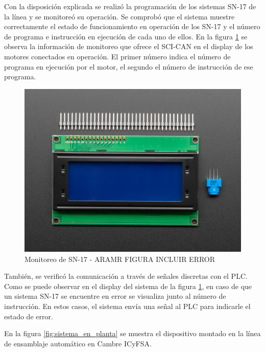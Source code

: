 Con la disposición explicada se realizó la programación de los sistemas SN-17 de la línea y se monitoreó su operación. Se comprobó que el sistema muestre correctamente el estado de funcionamiento en operación de los SN-17 y el número de programa e instrucción en ejecución de cada uno de ellos. En la figura \ref{fig:pantalla_monitoreo} se observa la información de monitoreo que ofrece el SCI-CAN en el display de los motores conectados en operación. El primer número indica el número de programa en ejecución por el motor, el segundo el número de instrucción de ese programa.

\begin{figure}[htbp]
	\centering
	\includegraphics[scale=1]{./Figures/LCD.jpg}
	\caption{Monitoreo de SN-17 - ARAMR FIGURA INCLUIR ERROR}
	\label{fig:pantalla_monitoreo}
\end{figure}

También, se verificó la comunicación a través de señales discretas con el PLC. Como se puede observar en el display del sistema de la figura \ref{fig:pantalla_monitoreo}, en caso de que un sistema SN-17 se encuentre en error se visualiza junto al número de instrucción. En estos casos, el sistema envía una señal al PLC para indicarle el estado de error.

En la figura \ref{fig:sistema_en_planta} se muestra el dispositivo montado en la línea de ensamblaje automático en Cambre ICyFSA.

